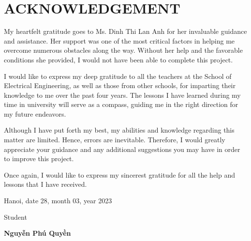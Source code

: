 \section*{ACKNOWLEDGEMENT}
    \thispagestyle{empty}
    \indent
My heartfelt gratitude goes to Ms. Dinh Thi Lan Anh for her invaluable guidance and assistance. Her support was one of the most critical factors in helping me \linebreak overcome numerous obstacles along the way. Without her help and the favorable conditions she provided, I would not have been able to complete this project.

I would like to express my deep gratitude to all the teachers at the School of Electrical Engineering, as well as those from other schools, for imparting their knowledge to me over the past four years. The lessons I have learned during my time in university will serve as a compass, guiding me in the right direction for my future endeavors.

Although I have put forth my best, my abilities and knowledge regarding this matter are limited. Hence, errors are inevitable. Therefore, I would greatly appreciate your guidance and any additional suggestions you may have in order to improve this project.

Once again, I would like to express my sincerest gratitude for all the help and lessons that I have received.

\vspace{6pt}
    \hspace{7.5cm}Hanoi, date 28, month 03, year 2023
        
        \hspace{10cm} Student      %

\vspace{2cm}
    \hspace{9.25cm}\textbf{Nguyễn Phú Quyền} %